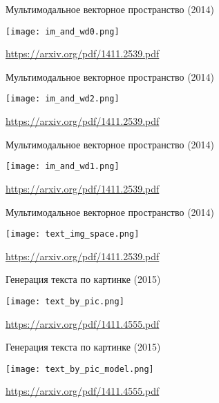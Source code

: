 \documentclass[notes,12pt, aspectratio=169]{beamer}
\begin{document}
\begin{frame}{Мультимодальное векторное пространство (2014)}
	\begin{center}
		\texttt{[image: im\_and\_wd0.png]}
	\end{center}
	\vfill
\footnotesize  {\color{blue} \url{https://arxiv.org/pdf/1411.2539.pdf}}
\end{frame} 


\begin{frame}{Мультимодальное векторное пространство (2014)}
	\begin{center}
		\texttt{[image: im\_and\_wd2.png]}
	\end{center}
	\vfill
	\footnotesize  {\color{blue} \url{https://arxiv.org/pdf/1411.2539.pdf}}
\end{frame} 


\begin{frame}{Мультимодальное векторное пространство (2014)}
	\begin{center}
		\texttt{[image: im\_and\_wd1.png]}
	\end{center}
	\vfill
	\footnotesize  {\color{blue} \url{https://arxiv.org/pdf/1411.2539.pdf}}
\end{frame} 


\begin{frame}{Мультимодальное векторное пространство (2014)}
	\begin{center}
		\texttt{[image: text\_img\_space.png]}
	\end{center}
	\vfill
	\footnotesize  {\color{blue} \url{https://arxiv.org/pdf/1411.2539.pdf}}
\end{frame} 


\begin{frame}{Генерация текста по картинке (2015)}
	\begin{center}
		\texttt{[image: text\_by\_pic.png]}
	\end{center}
	\vfill
	\footnotesize  {\color{blue} \url{https://arxiv.org/pdf/1411.4555.pdf}}
\end{frame} 


\begin{frame}{Генерация текста по картинке (2015)}
	\begin{center}
		\texttt{[image: text\_by\_pic\_model.png]}
	\end{center}
	\vfill
	\footnotesize  {\color{blue} \url{https://arxiv.org/pdf/1411.4555.pdf}}
\end{frame} 
\end{document}
